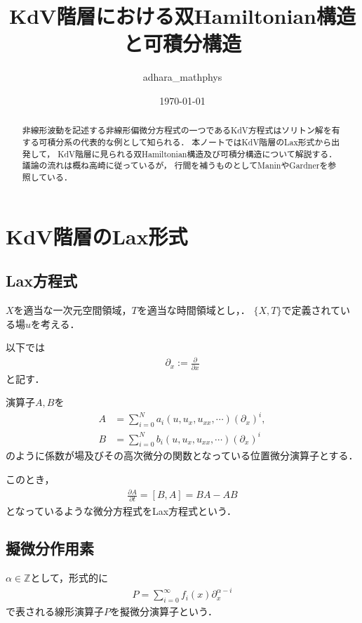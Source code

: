 \documentclass[dvipdfmx,12pt,a4paper,uplatex]{jsarticle}
\theoremstyle{plain}
\theoremstyle{definition}
\begin{document}
\title{KdV階層における双Hamiltonian構造と可積分構造}
\author{adhara\_mathphys}
\date{\today}
\maketitle
\begin{abstract}
非線形波動を記述する非線形偏微分方程式の一つであるKdV方程式はソリトン解を有する可積分系の代表的な例として知られる\cite{Wiki}．
本ノートではKdV階層のLax形式から出発して，
KdV階層に見られる双Hamiltonian構造及び可積分構造について解説する．
議論の流れは概ね高崎\cite{可積分の数理}に従っているが，
行間を補うものとしてManin\cite{Manin}やGardner\cite{Gardner}を参照している．
\end{abstract}
\tableofcontents
\newpage

\section{KdV階層のLax形式}
\subsection{Lax方程式}
$X$を適当な一次元空間領域，$T$を適当な時間領域とし，．
$\{X,T\}$で定義されている場$u$を考える．

以下では
\begin{align}
\partial_x := \frac{\partial}{\partial x}
\end{align}
と記す．

演算子$A,B$を
\begin{align}
A &= \sum_{i=0}^N a_i(u,u_x,u_{xx},\cdots) (\partial_x)^i , \nonumber \\
B &= \sum_{i=0}^N b_i(u,u_x,u_{xx},\cdots) (\partial_x)^i
\end{align}
のように係数が場及びその高次微分の関数となっている位置微分演算子とする．

このとき，
\begin{align}
\frac{\partial A}{\partial t} = [B,A] = BA -AB
\end{align}
となっているような微分方程式をLax方程式という．

\subsection{擬微分作用素}
$\alpha\in \mathbb{Z}$として，形式的に
\begin{align}
P = \sum_{i=0}^{\infty} f_i(x) \partial_x^{\alpha-i}
\end{align}
で表される線形演算子$P$を擬微分演算子という．
\end{document}
